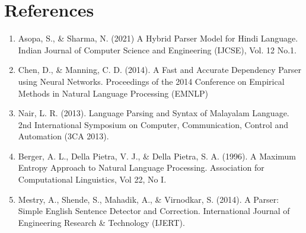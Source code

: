 \documentclass[12pt]{article}
\begin{document}
	\newpage
	\section*{References}
	\begin{enumerate}
		\item Asopa, S., \& Sharma, N. (2021) A Hybrid Parser Model for Hindi Language. Indian
		Journal of Computer Science and Engineering (IJCSE), Vol. 12 No.1.
		\item Chen, D., \& Manning, C. D. (2014). A Fast and Accurate Dependency Parser using
		Neural Networks. Proceedings of the 2014 Conference on Empirical Methods in
		Natural Language Processing (EMNLP)
		\item Nair, L. R. (2013). Language Parsing and Syntax of Malayalam Language. 2nd
		International Symposium on Computer, Communication, Control and Automation
		(3CA 2013).
		\item Berger, A. L., Della Pietra, V. J., \& Della Pietra, S. A. (1996). A Maximum Entropy
		Approach to Natural Language Processing. Association for Computational
		Linguistics, Vol 22, No I.
		\item Mestry, A., Shende, S., Mahadik, A., \& Virnodkar, S. (2014). A Parser: Simple
		English Sentence Detector and Correction. International Journal of Engineering
		Research \& Technology (IJERT).
		
	\end{enumerate}
	
\end{document}
